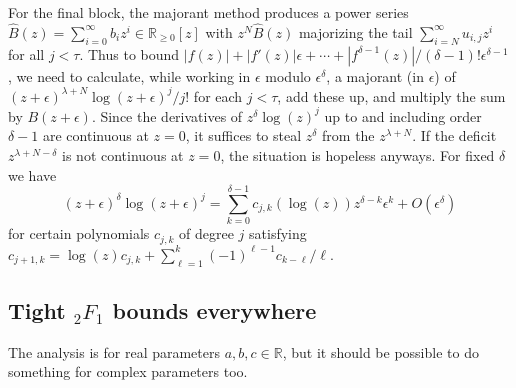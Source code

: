\documentclass[12pt]{article}
\numberwithin{equation}{section}
\begin{document}
For the final block, the majorant method produces a power series $\hat{B}(z) = \sum_{i=0}^{\infty} b_i z^i \in \mathbb{R}_{\ge 0}[z]$ with $z^N \hat{B}(z)$ majorizing the tail $\sum_{i = N}^{\infty} u_{i,j} z^i$ for all $j<\tau$. Thus to bound $|f(z)| + |f'(z)| \epsilon + \cdots + |f^{\delta-1}(z)|/(\delta-1)! \epsilon^{\delta-1}$, we need to calculate, while working in $\epsilon$ modulo $\epsilon^{\delta}$, a majorant (in $\epsilon$) of $(z+\epsilon)^{\lambda+N} \log(z+\epsilon)^j/j!$ for each $j<\tau$, add these up, and multiply the sum by $B(z+\epsilon)$. Since the derivatives of $z^\delta \log(z)^{j}$ up to and including order $\delta-1$ are continuous at $z=0$, it suffices to steal $z^\delta$ from the $z^{\lambda+N}$. If the deficit $z^{\lambda+N-\delta}$ is not continuous at $z=0$, the situation is hopeless anyways.
For fixed $\delta$ we have
\begin{equation*}
(z+\epsilon)^\delta \log(z+\epsilon)^{j} = \sum_{k=0}^{\delta-1} c_{j,k}(\log(z)) z^{\delta-k} \epsilon^{k} + O(\epsilon^\delta)
\end{equation*}
for certain polynomials $c_{j,k}$ of degree $j$ satisfying $c_{j+1,k} = \log(z) c_{j,k} + \sum_{\ell=1}^{k} (-1)^{\ell-1}c_{k-\ell}/\ell$.

\subsection{Tight ${}_2 F_1$ bounds everywhere}
The analysis is for real parameters $a,b,c \in \mathbb{R}$, but it should be possible to do something for complex parameters too.
\end{document}
